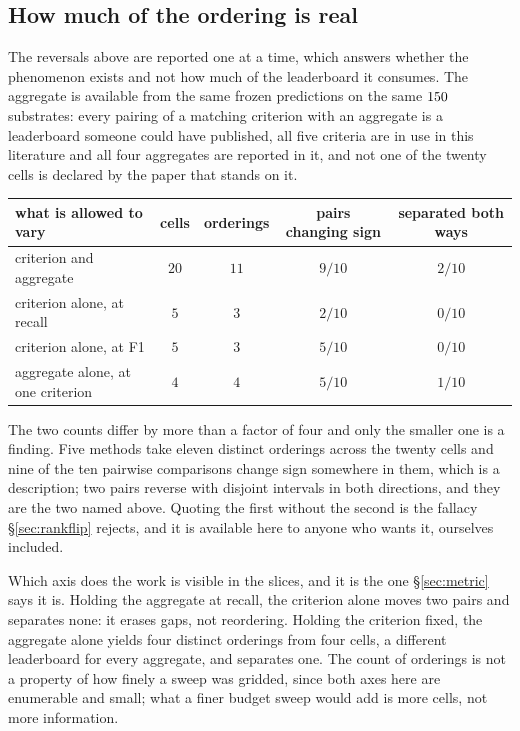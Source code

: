 \subsection{How much of the ordering is real}
\label{app:orderingstability}

The reversals above are reported one at a time, which answers whether the phenomenon exists and not
how much of the leaderboard it consumes. The aggregate is available from the same frozen predictions
on the same $150$ substrates: every pairing of a matching criterion with an aggregate is a
leaderboard someone could have published, all five criteria are in use in this literature and all
four aggregates are reported in it, and not one of the twenty cells is declared by the paper that
stands on it.

\begin{center}
\small
\begin{tabular}{lcccc}
\toprule
what is allowed to vary & cells & orderings & pairs changing sign & separated both ways \\
\midrule
criterion and aggregate            & $20$ & $11$ & $9/10$ & $2/10$ \\
criterion alone, at recall         & $5$  & $3$  & $2/10$ & $0/10$ \\
criterion alone, at F1             & $5$  & $3$  & $5/10$ & $0/10$ \\
aggregate alone, at one criterion  & $4$  & $4$  & $5/10$ & $1/10$ \\
\bottomrule
\end{tabular}
\end{center}

The two counts differ by more than a factor of four and only the smaller one is a finding. Five
methods take eleven distinct orderings across the twenty cells and nine of the ten pairwise
comparisons change sign somewhere in them, which is a description; two pairs reverse with disjoint
intervals in both directions, and they are the two named above. Quoting the first without the second
is the fallacy \S\ref{sec:rankflip} rejects, and it is available here to anyone who wants it,
ourselves included.

Which axis does the work is visible in the slices, and it is the one \S\ref{sec:metric} says it is.
Holding the aggregate at recall, the criterion alone moves two pairs and separates none: it erases
gaps, not reordering. Holding the criterion fixed, the aggregate alone yields four distinct
orderings from four cells, a different leaderboard for every aggregate, and separates one. The
count of orderings is not a property of how finely a sweep was gridded, since both axes here are
enumerable and small; what a finer budget sweep would add is more cells, not more information.

